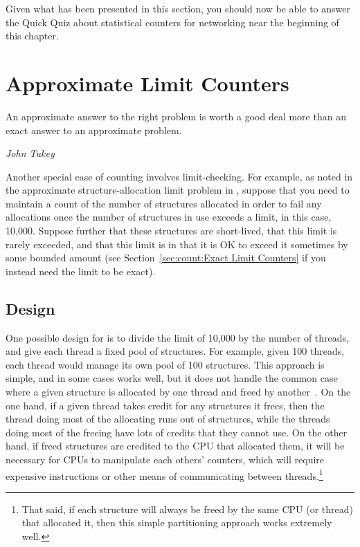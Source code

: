 Given what has been presented in this section, you should now be able
to answer the Quick Quiz about statistical counters for networking
near the beginning of this chapter.

\section{Approximate Limit Counters}
\label{sec:count:Approximate Limit Counters}
%
\epigraph{An approximate answer to the right problem is worth a good deal
	  more than an exact answer to an approximate problem.}
	 {\emph{John Tukey}}

Another special case of counting involves limit-checking.
For example, as noted in the approximate structure-allocation limit
problem in \QuickQuizRef{\QcountQapproxcnt},
suppose that you need to maintain a count of the number of
structures allocated in order to fail any allocations once the number
of structures in use exceeds a limit, in this case, 10,000.
Suppose further that these structures are short-lived, that this
limit is rarely exceeded, and that this limit is
 in
that it is OK to exceed it sometimes by some bounded amount
(see Section~\ref{sec:count:Exact Limit Counters}
if you instead need the limit to be exact).

\subsection{Design}

One possible design for  is to divide the limit of 10,000
by the number of threads, and give each thread a fixed pool of structures.
For example, given 100 threads, each thread would manage its own pool
of 100 structures.
This approach is simple, and in some cases works well, but it does not
handle the common case where a given structure is allocated by one
thread and freed by another~\cite{McKenney93}.
On the one hand, if a given thread takes credit for any structures it
frees, then the thread doing most of the allocating runs out
of structures, while the threads doing most of the freeing have lots
of credits that they cannot use.
On the other hand, if freed structures are credited to the CPU that
allocated them, it will be necessary for CPUs to manipulate each
others' counters, which will require expensive  instructions
or other means of communicating between threads.\footnote{
	That said, if each structure will always be freed
	by the same CPU (or thread) that allocated it, then
	this simple partitioning approach works extremely well.}

